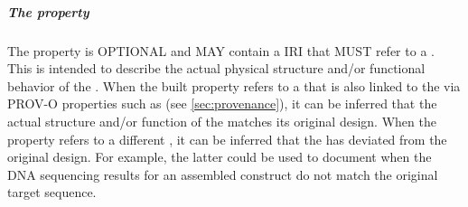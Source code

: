 \subparagraph{The  property}\label{sec:built}
The  property is OPTIONAL and MAY contain a IRI that MUST refer to a . This  is intended to describe the actual physical structure and/or functional behavior of the . When the built property refers to a  that is also linked to the  via PROV-O properties such as  (see \ref{sec:provenance}), it can be inferred that the actual structure and/or function of the  matches its original design. When the  property refers to a different , it can be inferred that the  has deviated from the original design. For example, the latter could be used to document when the DNA sequencing results for an assembled construct do not match the original target sequence.


